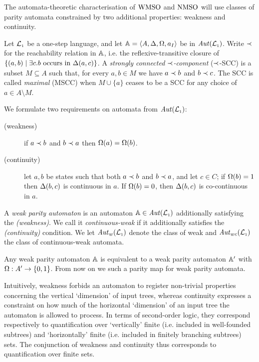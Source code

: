 The automata-theoretic characterisation of $\mathrm{WMSO}$ and $\mathrm{NMSO}$ will use classes of parity automata constrained by two additional properties: weakness
and continuity. 

\begin{definition}
\label{def:weak}
Let $\mathcal{L}_{\scriptscriptstyle 1}$ be a one-step language, and let $\mathbb{A} = \langle{A,\Delta,\Omega,a_I}\rangle$
be in $\mathit{Aut}(\mathcal{L}_{\scriptscriptstyle 1})$. Write $\prec$ for the reachability relation in $\mathbb{A}$, i.e. the reflexive-transitive closure of $\{ (a,b) \mid \exists c. b \text{ occurs in }\tmap(a,c)\}$. A \emph{strongly connected $\prec$-component} ($\prec$-SCC) is a subset $M\subseteq A$ such that, for every $a,b \in M$ we have $a \prec b$ and $b \prec c$. The SCC is called \emph{maximal} (MSCC) when $M\cup\{a\}$ ceases to be a SCC for any choice of $a \in A\setminus M$.


We formulate two requirements on automata from $\mathit{Aut}(\mathcal{L}_{\scriptscriptstyle 1})$:
\begin{description}
\item[(weakness)] if $a \prec b$ and $b \prec a$ then $\Omega(a) = \Omega(b)$.
\item[(continuity)] let $a,b$ be states such that both $a\prec b$ and
$b \prec a$, and let $c\in C$;
    if ${\Omega(b)}=1$ then $\Delta(b,c)$ is continuous in $a$.
    If $\Omega(b)=0$, then $\Delta(b,c)$ is co-continuous in $a$.
\end{description}
A \emph{weak parity automaton} is an automaton $\mathbb{A} \in \mathit{Aut}(\mathcal{L}_{\scriptscriptstyle 1})$ additionally satisfying the \emph{(weakness)}. We call it \emph{continuous-weak} if it additionally satisfies the \emph{(continuity)} condition. We let $\mathit{Aut}_{w}(\mathcal{L}_{\scriptscriptstyle 1})$ denote the class of weak and $\mathit{Aut}_{wc}(\mathcal{L}_{\scriptscriptstyle 1})$  the class of continuous-weak automata.
\end{definition}

\begin{remark}
Any weak parity automaton $\mathbb{A}$ is equivalent to a weak parity automaton
$\mathbb{A}'$ with $\Omega: A' \to \{0,1\}$. From now on we such a parity map for weak parity automata.
\end{remark}

Intuitively, weakness forbids an automaton to register non-trivial properties concerning the vertical `dimension' of input trees, whereas continuity expresses a constraint on how much of the horizontal `dimension' of an input tree the automaton is allowed to process. In terms of second-order logic, they correspond respectively to quantification over `vertically' finite (i.e. included in well-founded subtrees) and `horizontally' finite (i.e. included in finitely branching subtrees) sets. The conjunction of weakness and continuity thus corresponds to quantification over finite sets. 

